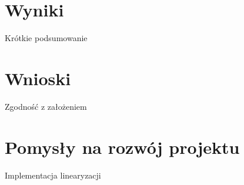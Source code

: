 \section{Wyniki}
Krótkie podsumowanie

\section{Wnioski}
Zgodność z założeniem

\section{Pomysły na rozwój projektu}
Implementacja linearyzacji